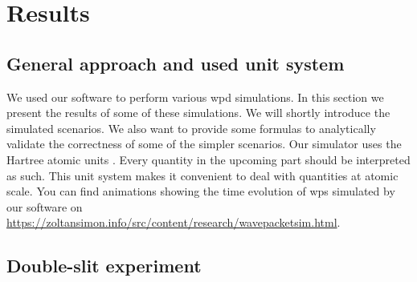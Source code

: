 \section{Results}
\label{sec:results}

\subsection{General approach and used unit system}

We used our software to perform various \acrshort{wpd} simulations.
In this section we present the results of some of these simulations.
We will shortly introduce the simulated scenarios.
We also want to provide some formulas to analytically validate the correctness of some of the simpler scenarios.
Our simulator uses the Hartree atomic units \cite{hartree_1928}.
Every quantity in the upcoming part should be interpreted as such.
This unit system makes it convenient to deal with quantities at atomic scale.
You can find animations showing the time evolution of \acrshort{wp}s simulated by our software on  \url{https://zoltansimon.info/src/content/research/wavepacketsim.html}.

\subsection{Double-slit experiment}

